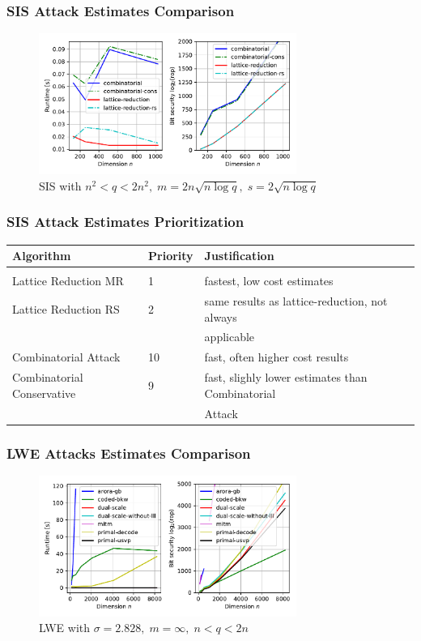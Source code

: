 \documentclass[t, aspectratio=169]{beamer}
\begin{document}
\begin{frame}
    \frametitle{SIS Attack Estimates Comparison} %
    \begin{figure}
        \centering
        \includegraphics[width=0.75\textwidth]{../thesis/graphics/SIS_plot_small.pdf}
        \caption{SIS with $n^2 < q < 2n^2, \; m = 2n \sqrt{n \log q}, \; s = 2 \sqrt{n \log q}$}
    \end{figure}
\end{frame}
\begin{frame}
    \frametitle{SIS Attack Estimates Prioritization} %
    \centering
    \begin{tabular}{lll}
        Algorithm                  & Priority & Justification                                    \\\hline \\[-1em]
        Lattice Reduction MR       & 1        & fastest, low cost estimates                      \\
        Lattice Reduction RS       & 2        & same results as lattice-reduction, not always    \\
                                   &          & applicable                                       \\
        Combinatorial Attack       & 10       & fast, often higher cost results                  \\
        Combinatorial Conservative & 9        & fast, slighly lower estimates than Combinatorial \\
                                   &          & Attack                                           \\
    \end{tabular}
\end{frame}
\begin{frame}
    \frametitle{LWE Attacks Estimates Comparison} %
    \begin{figure}
        \centering
        \includegraphics[width=0.75\textwidth]{../thesis/graphics/LWE_plot_long.pdf}
        \caption{LWE with $\sigma=2.828,\; m=\infty, \; n < q < 2n$}
    \end{figure}
\end{frame}
\end{document}
